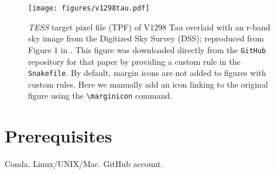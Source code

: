 \documentclass[twocolumn]{aastex631}
\begin{document}
\begin{figure}[ht!]
    \begin{centering}
        \texttt{[image: figures/v1298tau.pdf]}
        \caption{
            \emph{TESS} target pixel file (TPF) of V1298 Tau
            overlaid with an r-band sky image from the Digitized Sky Survey (DSS);
            reproduced from Figure 1 in \citet{Feinstein2021}.
            This figure was downloaded directly from the \texttt{GitHub} repository for that paper by providing a custom rule in the \texttt{Snakefile}.
            By default, margin icons are not added to figures with custom rules.
            Here we manually add an icon linking to the original figure using the \texttt{\textbackslash marginicon} command.
        }
        \label{fig*:v1298tau}
    \end{centering}
\end{figure}

\section{Prerequisites}
\label{sec:prereq}
Conda. Linux/UNIX/Mac. GitHub account.
\end{document}
